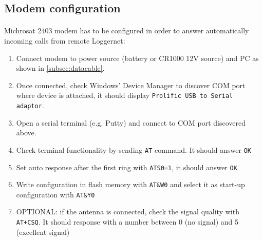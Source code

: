\subsection{Modem configuration}
\paragraph{} Michrosat 2403 modem has to be configured in order to answer automatically incoming calls from remote Loggernet:
\begin{enumerate}
	\item Connect modem to power source (battery or CR1000 12V source) and PC as shown in \ref{subsec:datacable}.
	\item Once connected, check Windows' Device Manager to discover COM port where device is attached, it should display {\tt Prolific USB to Serial adaptor}.
	\item Open a serial terminal (e.g. Putty) and connect to COM port discovered above.
	\item Check terminal functionality by sending {\tt AT} command. It should answer {\tt OK}
	\item Set auto response after the first ring with {\tt ATS0=1}, it should answer {\tt OK}
	\item Write configuration in flash memory with {\tt AT\&W0} and select it as start-up configuration with {\tt AT\&Y0}
	\item OPTIONAL: if the antenna is connected, check the signal quality with {\tt AT+CSQ}. It should response with a number between 0 (no signal) and 5 (excellent signal)
\end{enumerate}